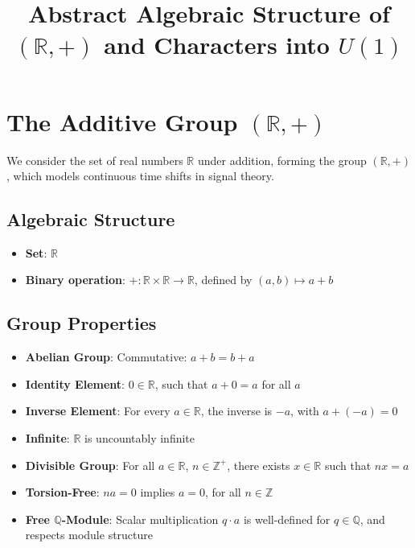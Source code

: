 \documentclass[12pt]{article}
\title{\textbf{Abstract Algebraic Structure of \((\mathbb{R}, +)\) and Characters into \(U(1)\)}}
\author{}
\date{}
\begin{document}
	\maketitle
	
	\section{The Additive Group \((\mathbb{R}, +)\)}
	
	We consider the set of real numbers \(\mathbb{R}\) under addition, forming the group \((\mathbb{R}, +)\), which models continuous time shifts in signal theory.
	
	\subsection*{Algebraic Structure}
	
	\begin{itemize}[leftmargin=1.5em]
		\item \textbf{Set}: \(\mathbb{R}\)
		\item \textbf{Binary operation}: \(+\colon \mathbb{R} \times \mathbb{R} \to \mathbb{R}\), defined by \((a, b) \mapsto a + b\)
	\end{itemize}
	
	\subsection*{Group Properties}
	
	\begin{itemize}[leftmargin=1.5em]
		\item \textbf{Abelian Group}: Commutative: \(a + b = b + a\)
		\item \textbf{Identity Element}: \(0 \in \mathbb{R}\), such that \(a + 0 = a\) for all \(a\)
		\item \textbf{Inverse Element}: For every \(a \in \mathbb{R}\), the inverse is \(-a\), with \(a + (-a) = 0\)
		\item \textbf{Infinite}: \(\mathbb{R}\) is uncountably infinite
		\item \textbf{Divisible Group}: For all \(a \in \mathbb{R}\), \(n \in \mathbb{Z}^+\), there exists \(x \in \mathbb{R}\) such that \(nx = a\)
		\item \textbf{Torsion-Free}: \(na = 0\) implies \(a = 0\), for all \(n \in \mathbb{Z}\)
		\item \textbf{Free \(\mathbb{Q}\)-Module}: Scalar multiplication \(q \cdot a\) is well-defined for \(q \in \mathbb{Q}\), and respects module structure
	\end{itemize}
	
\end{document}
